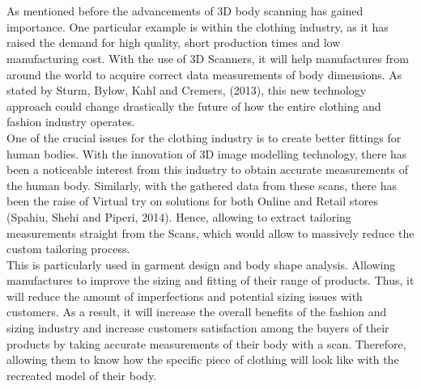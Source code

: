 \documentclass[a4paper]{thesis}
\begin{document}
 \section*{}
 As mentioned before the advancements of 3D body scanning has gained importance. One particular example is within the clothing industry, as it has raised the demand for high quality, short production times and low manufacturing cost. 
 With the use of 3D Scanners, it will help manufactures from around the world to acquire correct data measurements of body dimensions. 
 As stated by Sturm, Bylow, Kahl and Cremers, (2013), this new technology approach could change drastically the future of how the entire clothing and fashion industry operates.\\[10pt]
 One of the crucial issues for the clothing industry is to create better fittings for human bodies.
 With the innovation of 3D image modelling technology, there has been a noticeable interest from this industry to obtain accurate measurements of the human body.
 Similarly, with the gathered data from these scans, there has been the raise of Virtual try on solutions for both Online and Retail stores (Spahiu, Shehi and Piperi, 2014). 
 Hence, allowing to extract tailoring measurements straight from the Scans, which would allow to massively reduce the custom tailoring process. \\[10pt]
 This is particularly used in garment design and body shape analysis. Allowing manufactures to improve the sizing and fitting of their range of products. 
 Thus, it will reduce the amount of imperfections and potential sizing issues with customers. 
 As a result, it will increase the overall benefits of the fashion and sizing industry and increase customers satisfaction among the buyers of their products by taking accurate measurements of their body with a scan. 
 Therefore, allowing them to know how the specific piece of clothing will look like with the recreated model of their body. 
 \enlargethispage{\baselineskip}
\end{document}
